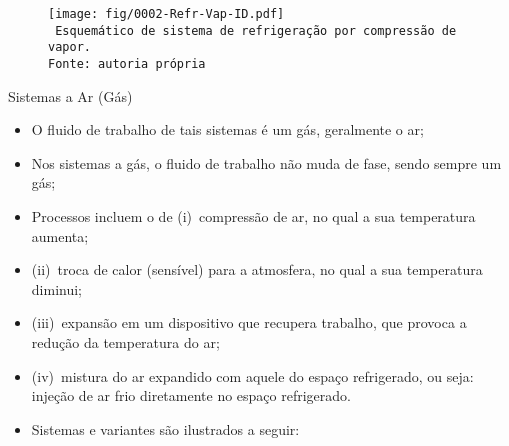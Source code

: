     \begin{frame}\vspace*{-0em}
        \begin{center}
            \begin{figure}
                \fontsize{5.0}{5}\selectfont
                \texttt{[image: fig/0002-Refr-Vap-ID.pdf]}
                \\\vspace*{-0.0em}\texttt{%
                    Esquemático de sistema de refrigeração por compressão de vapor.\\
                    Fonte: autoria própria
                }
            \end{figure}
        \end{center}
    \end{frame}

    \begin{frame}{Sistemas a Ar (Gás)}\vspace*{-0em}
        \begin{itemize}
            \item<1-> O \alert{fluido de trabalho} de tais sistemas é um \alert{gás}, geralmente
                o \alert{ar};
            \item<2-> Nos sistemas a gás, o fluido de trabalho \alert{não muda de fase}, sendo
                sempre um gás;
            \item<3-> Processos incluem o de (i)~\alert{compressão} de ar, no qual a sua
                temperatura \alert{aumenta};
            \item<4-> (ii)~\alert{troca de calor} (sensível) para a atmosfera, no qual a sua temperatura \alert{diminui};
            \item<5-> (iii)~\alert{expansão} em um dispositivo que recupera \alert{trabalho},
                que provoca a \alert{redução} da temperatura do ar;
            \item<6-> (iv)~\alert{mistura} do ar expandido com aquele do espaço refrigerado, ou
                seja: \alert{injeção de ar frio} diretamente no espaço refrigerado.
            \item<7-> Sistemas e variantes são ilustrados a seguir:
        \end{itemize}
    \end{frame}

